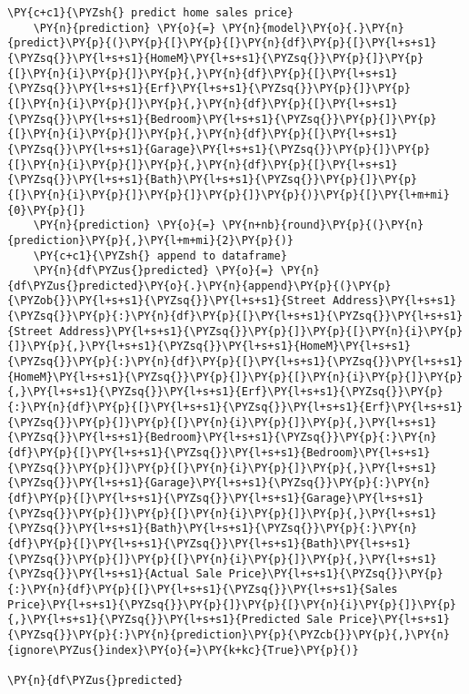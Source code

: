 \begin{tcolorbox}[breakable, size=fbox, boxrule=1pt, pad at break*=1mm,colback=cellbackground, colframe=cellborder]
\begin{Verbatim}[commandchars=\\\{\}]
    \PY{c+c1}{\PYZsh{} predict home sales price}
    \PY{n}{prediction} \PY{o}{=} \PY{n}{model}\PY{o}{.}\PY{n}{predict}\PY{p}{(}\PY{p}{[}\PY{p}{[}\PY{n}{df}\PY{p}{[}\PY{l+s+s1}{\PYZsq{}}\PY{l+s+s1}{HomeM}\PY{l+s+s1}{\PYZsq{}}\PY{p}{]}\PY{p}{[}\PY{n}{i}\PY{p}{]}\PY{p}{,}\PY{n}{df}\PY{p}{[}\PY{l+s+s1}{\PYZsq{}}\PY{l+s+s1}{Erf}\PY{l+s+s1}{\PYZsq{}}\PY{p}{]}\PY{p}{[}\PY{n}{i}\PY{p}{]}\PY{p}{,}\PY{n}{df}\PY{p}{[}\PY{l+s+s1}{\PYZsq{}}\PY{l+s+s1}{Bedroom}\PY{l+s+s1}{\PYZsq{}}\PY{p}{]}\PY{p}{[}\PY{n}{i}\PY{p}{]}\PY{p}{,}\PY{n}{df}\PY{p}{[}\PY{l+s+s1}{\PYZsq{}}\PY{l+s+s1}{Garage}\PY{l+s+s1}{\PYZsq{}}\PY{p}{]}\PY{p}{[}\PY{n}{i}\PY{p}{]}\PY{p}{,}\PY{n}{df}\PY{p}{[}\PY{l+s+s1}{\PYZsq{}}\PY{l+s+s1}{Bath}\PY{l+s+s1}{\PYZsq{}}\PY{p}{]}\PY{p}{[}\PY{n}{i}\PY{p}{]}\PY{p}{]}\PY{p}{]}\PY{p}{)}\PY{p}{[}\PY{l+m+mi}{0}\PY{p}{]}
    \PY{n}{prediction} \PY{o}{=} \PY{n+nb}{round}\PY{p}{(}\PY{n}{prediction}\PY{p}{,}\PY{l+m+mi}{2}\PY{p}{)}
    \PY{c+c1}{\PYZsh{} append to dataframe}
    \PY{n}{df\PYZus{}predicted} \PY{o}{=} \PY{n}{df\PYZus{}predicted}\PY{o}{.}\PY{n}{append}\PY{p}{(}\PY{p}{\PYZob{}}\PY{l+s+s1}{\PYZsq{}}\PY{l+s+s1}{Street Address}\PY{l+s+s1}{\PYZsq{}}\PY{p}{:}\PY{n}{df}\PY{p}{[}\PY{l+s+s1}{\PYZsq{}}\PY{l+s+s1}{Street Address}\PY{l+s+s1}{\PYZsq{}}\PY{p}{]}\PY{p}{[}\PY{n}{i}\PY{p}{]}\PY{p}{,}\PY{l+s+s1}{\PYZsq{}}\PY{l+s+s1}{HomeM}\PY{l+s+s1}{\PYZsq{}}\PY{p}{:}\PY{n}{df}\PY{p}{[}\PY{l+s+s1}{\PYZsq{}}\PY{l+s+s1}{HomeM}\PY{l+s+s1}{\PYZsq{}}\PY{p}{]}\PY{p}{[}\PY{n}{i}\PY{p}{]}\PY{p}{,}\PY{l+s+s1}{\PYZsq{}}\PY{l+s+s1}{Erf}\PY{l+s+s1}{\PYZsq{}}\PY{p}{:}\PY{n}{df}\PY{p}{[}\PY{l+s+s1}{\PYZsq{}}\PY{l+s+s1}{Erf}\PY{l+s+s1}{\PYZsq{}}\PY{p}{]}\PY{p}{[}\PY{n}{i}\PY{p}{]}\PY{p}{,}\PY{l+s+s1}{\PYZsq{}}\PY{l+s+s1}{Bedroom}\PY{l+s+s1}{\PYZsq{}}\PY{p}{:}\PY{n}{df}\PY{p}{[}\PY{l+s+s1}{\PYZsq{}}\PY{l+s+s1}{Bedroom}\PY{l+s+s1}{\PYZsq{}}\PY{p}{]}\PY{p}{[}\PY{n}{i}\PY{p}{]}\PY{p}{,}\PY{l+s+s1}{\PYZsq{}}\PY{l+s+s1}{Garage}\PY{l+s+s1}{\PYZsq{}}\PY{p}{:}\PY{n}{df}\PY{p}{[}\PY{l+s+s1}{\PYZsq{}}\PY{l+s+s1}{Garage}\PY{l+s+s1}{\PYZsq{}}\PY{p}{]}\PY{p}{[}\PY{n}{i}\PY{p}{]}\PY{p}{,}\PY{l+s+s1}{\PYZsq{}}\PY{l+s+s1}{Bath}\PY{l+s+s1}{\PYZsq{}}\PY{p}{:}\PY{n}{df}\PY{p}{[}\PY{l+s+s1}{\PYZsq{}}\PY{l+s+s1}{Bath}\PY{l+s+s1}{\PYZsq{}}\PY{p}{]}\PY{p}{[}\PY{n}{i}\PY{p}{]}\PY{p}{,}\PY{l+s+s1}{\PYZsq{}}\PY{l+s+s1}{Actual Sale Price}\PY{l+s+s1}{\PYZsq{}}\PY{p}{:}\PY{n}{df}\PY{p}{[}\PY{l+s+s1}{\PYZsq{}}\PY{l+s+s1}{Sales Price}\PY{l+s+s1}{\PYZsq{}}\PY{p}{]}\PY{p}{[}\PY{n}{i}\PY{p}{]}\PY{p}{,}\PY{l+s+s1}{\PYZsq{}}\PY{l+s+s1}{Predicted Sale Price}\PY{l+s+s1}{\PYZsq{}}\PY{p}{:}\PY{n}{prediction}\PY{p}{\PYZcb{}}\PY{p}{,}\PY{n}{ignore\PYZus{}index}\PY{o}{=}\PY{k+kc}{True}\PY{p}{)}

\PY{n}{df\PYZus{}predicted}    
\end{Verbatim}
\end{tcolorbox}

